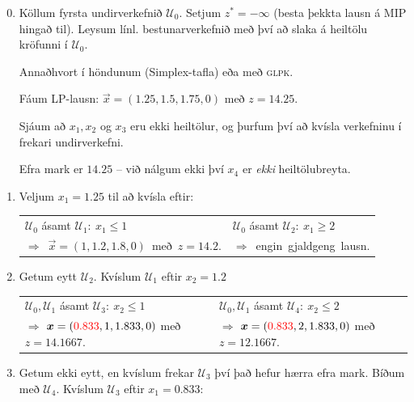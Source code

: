 \begin{lausn}\hspace{.1cm}
  \begin{enumerate}[label=(\arabic{*})]\setcounter{enumi}{-1}
    \item Köllum fyrsta undirverkefnið $\mathcal{U}_0$. Setjum $z^*=-\infty$ (besta þekkta lausn á MIP hingað til).    
    Leysum línl. bestunarverkefnið með því að slaka á heiltölu kröfunni í $\mathcal{U}_0$.
 \begin{samepage}   \begin{aths} Annaðhvort í höndunum (Simplex-tafla) eða með \textsc{glpk}.     \end{aths}\end{samepage}
    Fáum LP-lausn: $\vec{x}=(1.25,1.5,1.75,0)$ með $z=14.25$.

    Sjáum að $x_1,x_2$ og $x_3$ eru ekki heiltölur, og þurfum því að kvísla verkefninu í frekari undirverkefni.

    Efra mark er $14.25$ -- við nálgum ekki því $x_4$ er \emph{ekki} heiltölubreyta.

    \item Veljum $x_1=1.25$ til að kvísla eftir:
    
    \begin{tabular}{p{7cm}|p{5cm}}
      $\mathcal{U}_0$ ásamt \mbox{$\mathcal{U}_1:~x_1\leq1$} &  $\mathcal{U}_0$ ásamt \mbox{$\mathcal{U}_2:~x_1\geq2$} \\
      \mbox{$\Rightarrow$ $\vec{x}=(1,1.2,1.8,0)$ með $z=14.2$}. &
      \mbox{$\Rightarrow$ engin gjaldgeng lausn}.
    \end{tabular}
    
    \item Getum eytt $\mathcal{U}_2$. Kvíslum $\mathcal{U}_1$ eftir $x_2=1.2$

    \begin{tabular}{p{6cm}|p{6cm}}
      $\mathcal{U}_0,\mathcal{U}_1$ ásamt \mbox{$\mathcal{U}_3:~x_2\leq1$} &
      $\mathcal{U}_0,\mathcal{U}_1$ ásamt \mbox{$\mathcal{U}_4:~x_2\leq2$} \\
      $\Rightarrow$ $\vec{x}=({\color{red}{0.833}},1,1.833,0)$ með $z=14.1667$. &
      $\Rightarrow$ $\vec{x}=({\color{red}{0.833}},2,1.833,0)$ með $z=12.1667$. 
    \end{tabular}

    \item Getum ekki eytt, en kvíslum frekar $\mathcal{U}_3$ því það hefur hærra efra mark. Bíðum með $\mathcal{U}_4$.
    Kvíslum $\mathcal{U}_3$  eftir $x_1=0.833$:


\end{enumerate}
\end{lausn}
